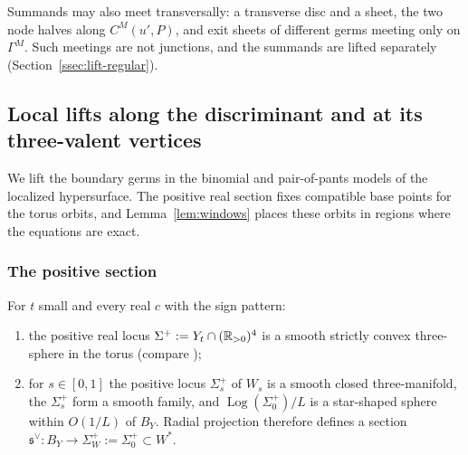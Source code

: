 Summands may also meet transversally: a transverse disc and a sheet, the two node halves along $C^M(u',P)$, and exit
sheets of different germs meeting only on $\Gamma^M$. Such meetings are not junctions, and the summands are lifted
separately (Section~\ref{ssec:lift-regular}).

\subsection{Local lifts along the discriminant and at its three-valent vertices}\label{ssec:lift-legs}

We lift the boundary germs in the binomial and pair-of-pants models of the localized hypersurface.
The positive real section fixes compatible base points for the torus orbits, and Lemma~\ref{lem:windows} places these orbits in regions where the equations are exact.

\subsubsection*{The positive section}
\begin{lemma}\label{lem:possec}
For $t$ small and every real $c$ with the sign pattern:
\begin{enumerate}
\item the positive real locus $\Sigma^+:=Y_t\cap(\mathbb R_{>0})^4$ is a smooth strictly convex three-sphere in the torus
(compare \cite[\S3.1]{AGIS20});
\item for $s\in[0,1]$ the positive locus $\Sigma^+_s$ of $W_s$ is a smooth closed three-manifold, the $\Sigma^+_s$ form a
smooth family, and $\operatorname{Log}(\Sigma^+_0)/L$ is a star-shaped sphere within $O(1/L)$ of $B_Y$. Radial projection
therefore defines a section $\mathfrak s^\vee\colon B_Y\to\Sigma^+_W:=\Sigma^+_0\subset W^*$.
\end{enumerate}
\end{lemma}

